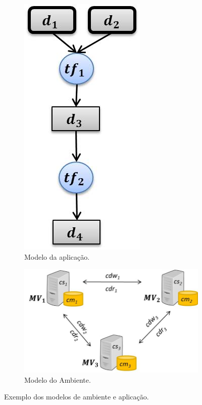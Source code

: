     \begin{figure}[H]
    \centering
    \begin{subfigure}{.45\textwidth}
      \centering
    	\includegraphics[width=.4\linewidth]{figure/app_model.jpg}
    	\caption{Modelo da aplicação.}
    	\label{app_model}
    \end{subfigure}
    \begin{subfigure}{.5\textwidth}
      \centering
    	\includegraphics[width=\linewidth]{figure/arch_model1.jpg}
    	\caption{Modelo do Ambiente.}
    	\label{arch_model}
    \end{subfigure}
    \caption{Exemplo dos modelos de ambiente e aplicação.}
    \label{fig:definition}
    \end{figure}

